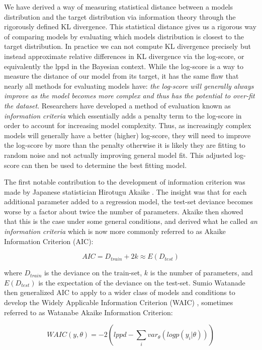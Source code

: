 We have derived a way of measuring statistical distance between a models distribution and the target distribution via information theory through the rigorously defined KL divergence. This statistical distance gives us a rigorous way of comparing models by evaluating which models distribution is closest to the target distribution. In practice we can not compute KL divergence precisely but instead approximate relative differences in KL divergence via the log-score, or equivalently the lppd in the Bayesian context. While the log-score is a way to measure the distance of our model from its target, it has the same flaw that nearly all methods for evaluating models have: \textit{the log-score will generally always improve as the model becomes more complex and thus has the potential to over-fit the dataset}. Researchers have developed a method of evaluation known as \textit{information criteria} which essentially adds a penalty term to the log-score in order to account for increasing model complexity. Thus, as increasingly complex models will generally have a better (higher) log-score, they will need to improve the log-score by more than the penalty otherwise it is likely they are fitting to random noise and not actually improving general model fit. This adjusted log-score can then be used to determine the best fitting model.

The first notable contribution to the development of information criterion was made by Japanese statistician Hirotugu Akaike \cite{Akaike1974}. The insight was that for each additional parameter added to a regression model, the test-set deviance becomes worse by a factor about twice the number of parameters. Akaike then showed that this is the case under some general conditions, and derived what he called \textit{an information criteria} which is now more commonly referred to as Akaike Information Criterion (AIC):

\begin{equation}
AIC = D_{train} + 2k \approx E(D_{test})
\end{equation}

where $D_{train}$ is the deviance on the train-set, $k$ is the number of parameters, and $E(D_{test})$ is the expectation of the deviance on the test-set. Sumio Watanade then generalized AIC to apply to a wider class of models and conditions to develop the Widely Applicable Information Criterion (WAIC) \cite{Watanabe2010}, sometimes referred to as Watanabe Akaike Information Criterion:

\begin{equation} \label{eq:waic}
WAIC(y, \theta) = -2 \left( lppd - \sum_i var_{\theta}(logp(y_i|\theta)) \right)
\end{equation}

